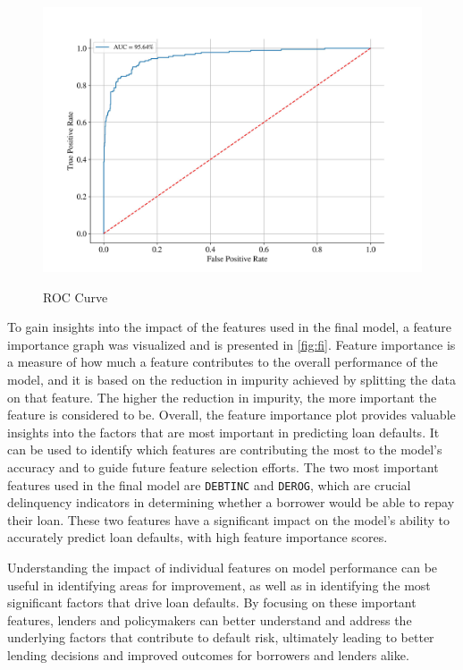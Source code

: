 \begin{figure}[H]
    \centering
    \caption{ROC Curve}\vspace{0.5em}
    \label{fig:roc}\
    \includegraphics[width=150mm]{Figures/ROC_curve_FINAL.jpg}
    \vspace{-1em}
\end{figure}
To gain insights into the impact of the features used in the final model, a feature importance graph was visualized and is presented in \autoref{fig:fi}.
Feature importance is a measure of how much a feature contributes to the overall performance of the model, and it is based on the reduction in impurity achieved by splitting the data on that feature.
The higher the reduction in impurity, the more important the feature is considered to be.
Overall, the feature importance plot provides valuable insights into the factors that are most important in predicting loan defaults. It can be used to identify which features are contributing the most to the model's accuracy and to guide future feature selection efforts.
The two most important features used in the final model are \texttt{DEBTINC} and \texttt{DEROG}, which are crucial delinquency indicators in determining whether a borrower would be able to repay their loan. These two features have a significant impact on the model's ability to accurately predict loan defaults, with high feature importance scores.

Understanding the impact of individual features on model performance can be useful in identifying areas for improvement, as well as in identifying the most significant factors that drive loan defaults.
By focusing on these important features, lenders and policymakers can better understand and address the underlying factors that contribute to default risk, ultimately leading to better lending decisions and improved outcomes for borrowers and lenders alike.

